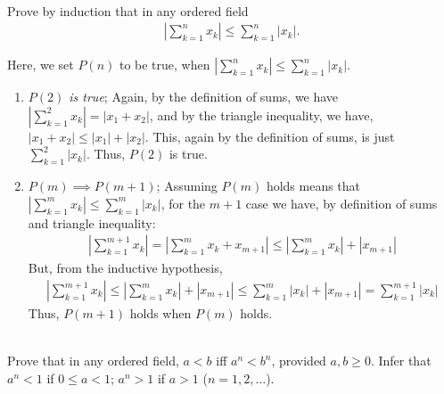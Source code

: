 \documentclass[12pt]{book}
\theoremstyle{definition}
\begin{document}
\begin{ex}[6]
\\
Prove by induction that in any ordered field
\begin{align*}
	\left| \sum_{k=1}^n x_k \right| \leq \sum_{k=1}^n |x_k|.
\end{align*}	
\end{ex}
\begin{sol}
	Here, we set $P(n)$ to be true, when $| \sum_{k=1}^n x_k | \leq \sum_{k=1}^n |x_k|$.
\begin{enumerate}[label=(\roman*)]
	\item \textit{$P(2)$ is true}; Again, by the definition of sums, we have $| \sum_{k=1}^2 x_k |= |x_1+x_2|$, and by the triangle inequality, we have, $|x_1+x_2| \leq |x_1|+|x_2|$. This, again by the definition of sums, is just $\sum_{k=1}^2 |x_k|$. Thus, $P(2)$ is true.
	\item $P(m)\implies P(m+1)$; Assuming $P(m)$ holds means that $| \sum_{k=1}^m x_k | \leq \sum_{k=1}^m |x_k|$, for the $m+1$ case we have, by definition of sums and triangle inequality:
		\begin{align*}
			\left| \sum_{k=1}^{m+1} x_k \right|= \left| \sum_{k=1}^{m} x_k +x_{m+1}\right| \leq \left|\sum_{k=1}^{m} x_k\right|+|x_{m+1}|
		\end{align*}
		But, from the inductive hypothesis, 
		\begin{align*}
			\left| \sum_{k=1}^{m+1} x_k \right| \leq \left|\sum_{k=1}^{m} x_k\right|+|x_{m+1}| \leq \sum_{k=1}^m |x_k| +|x_{m+1}|= \sum_{k=1}^{m+1} |x_k|
		\end{align*}
		Thus, $P(m+1)$ holds when $P(m)$ holds.  
\end{enumerate}
\end{sol}
\begin{ex}[7]
\\
Prove that in any ordered field, $a<b$ iff $a^n < b^n$, provided $a,b \geq 0$. Infer that $a^n < 1$ if $0 \leq a <1$; $a^n >1$ if $a>1$ ($n=1,2,\ldots$).	
\end{ex}
\end{document}
